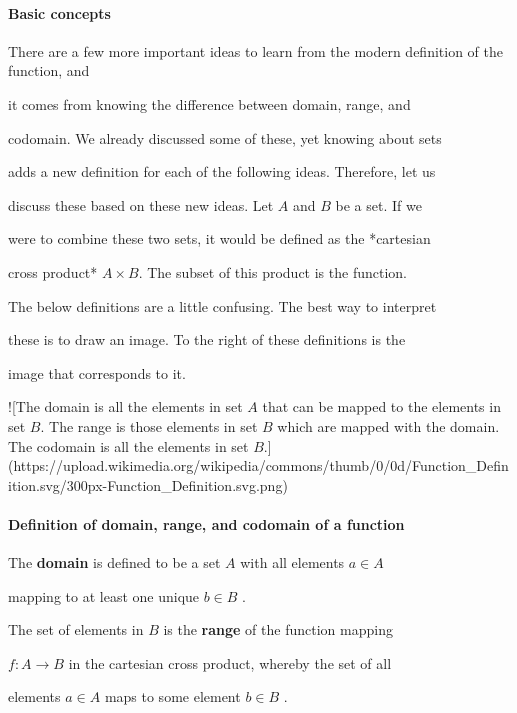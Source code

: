 \paragraph{Basic concepts}



There are a few more important ideas to learn from the modern definition of the function, and

it comes from knowing the difference between domain, range, and

codomain. We already discussed some of these, yet knowing about sets

adds a new definition for each of the following ideas. Therefore, let us

discuss these based on these new ideas. Let $A$ and $B$ be a set. If we

were to combine these two sets, it would be defined as the *cartesian

cross product* $A\times B$. The subset of this product is the function.

The below definitions are a little confusing. The best way to interpret

these is to draw an image. To the right of these definitions is the

image that corresponds to it.



![The domain is all the elements in set $A$ that can be mapped to the elements in set $B$. The range is those elements in set $B$ which are mapped with the domain. The codomain is all the elements in set $B$.] (https://upload.wikimedia.org/wikipedia/commons/thumb/0/0d/Function_Definition.svg/300px-Function_Definition.svg.png)



\paragraph{Definition of domain, range, and codomain of a function}



The \textbf{domain} is defined to be a set $A$ with all elements $a\in A$

mapping to at least one unique $b\in B$ .



The set of elements in $B$ is the \textbf{range} of the function mapping

$f:A\to B$ in the cartesian cross product, whereby the set of all

elements $a\in A$ maps to some element $b\in B$ .




